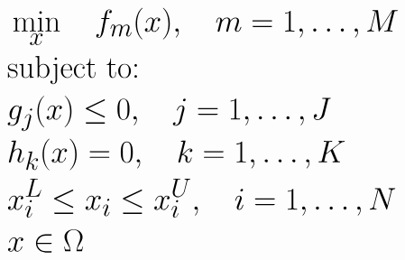 \documentclass{article}
\begin{document}
\[
\Huge
\begin{aligned}
    & \min_{x} \quad f_m(x), \quad m = 1, \dots, M \\
    & \text{subject to:} \\
    & g_j(x) \leq 0, \quad j = 1, \dots, J \\
    & h_k(x) = 0, \quad k = 1, \dots, K \\
    & x_i^L \leq x_i \leq x_i^U, \quad i = 1, \dots, N \\
    & x \in \Omega
\end{aligned}
\]
\end{document}
